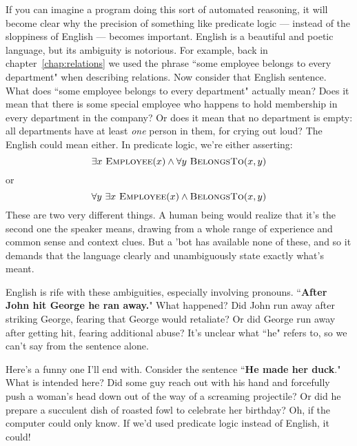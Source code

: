 If you can imagine a program doing this sort of automated reasoning, it
will become clear why the precision of something like predicate logic ---
instead of the sloppiness of English --- becomes important. English is a
beautiful and poetic language, but its ambiguity is notorious. For example,
back in chapter~\ref{chap:relations} we used the phrase ``some employee
belongs to every department" when describing relations. Now consider that
English sentence. What does ``some employee belongs to every department"
actually mean? Does it mean that there is some special employee who happens
to hold membership in every department in the company? Or does it mean that
no department is empty: all departments have at least \textit{one} person
in them, for crying out loud? The English could mean either. In predicate
logic, we're either asserting:
\[
\exists x\ \textsc{Employee}(x) \wedge \forall y\ \textsc{BelongsTo}(x,y)
\]
or
\[
\forall y\ \exists x\ \textsc{Employee}(x) \wedge \textsc{BelongsTo}(x,y)
\]
These are two very different things. A human being would realize that it's
the second one the speaker means, drawing from a whole range of experience
and common sense and context clues. But a 'bot has available none of these,
and so it demands that the language clearly and unambiguously state exactly
what's meant.

English is rife with these ambiguities, especially involving pronouns.
``\textbf{After John hit George he ran away.}" What happened? Did John run away
after striking George, fearing that George would retaliate? Or did George
run away after getting hit, fearing additional abuse? It's unclear what
``he" refers to, so we can't say from the sentence alone. 

Here's a funny one I'll end with. Consider the sentence ``\textbf{He made her
duck}." What is intended here? Did some guy reach out with his hand and
forcefully push a woman's head down out of the way of a screaming projectile?
Or did he prepare a succulent dish of roasted fowl to celebrate her birthday?
Oh, if the computer could only know. If we'd used predicate logic instead of
English, it could!



